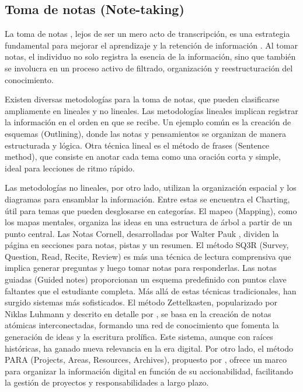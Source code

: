 \subsection{Toma de notas (Note-taking)}
La toma de notas , lejos de ser un mero acto de transcripción, es una estrategia fundamental para mejorar el aprendizaje y la retención de información \parencite{jansenIntegrativeReviewCognitive2017}. Al tomar notas, el individuo no solo registra la esencia de la información, sino que también se involucra en un proceso activo de filtrado, organización y reestructuración del conocimiento.

Existen diversas metodologías para la toma de notas, que pueden clasificarse ampliamente en lineales y no lineales.
Las metodologías lineales implican registrar la información en el orden en que se recibe. Un ejemplo común es la creación de esquemas (Outlining), donde las notas y pensamientos se organizan de manera estructurada y lógica. Otra técnica lineal es el método de frases (Sentence method), que consiste en anotar cada tema como una oración corta y simple, ideal para lecciones de ritmo rápido.

Las metodologías no lineales, por otro lado, utilizan la organización espacial y los diagramas para ensamblar la información. Entre estas se encuentra el Charting, útil para temas que pueden desglosarse en categorías. El mapeo (Mapping), como los mapas mentales, organiza las ideas en una estructura de árbol a partir de un punto central. Las Notas Cornell, desarrolladas por Walter Pauk \parencite{paukHowStudyCollege2010}, dividen la página en secciones para notas, pistas y un resumen. El método SQ3R (Survey, Question, Read, Recite, Review) es más una técnica de lectura comprensiva que implica generar preguntas y luego tomar notas para responderlas. Las notas guiadas (Guided notes) proporcionan un esquema predefinido con puntos clave faltantes que el estudiante completa.
Más allá de estas técnicas tradicionales, han surgido sistemas más sofisticados. El método Zettelkasten, popularizado por Niklas Luhmann y descrito en detalle por \cite{ahrensHowTakeSmart2017}, se basa en la creación de notas atómicas interconectadas, formando una red de conocimiento que fomenta la generación de ideas y la escritura prolífica. Este sistema, aunque con raíces históricas, ha ganado nueva relevancia en la era digital. Por otro lado, el método PARA (Projects, Areas, Resources, Archives), propuesto por \cite{forteBuildingSecondBrain2022}, ofrece un marco para organizar la información digital en función de su accionabilidad, facilitando la gestión de proyectos y responsabilidades a largo plazo.

